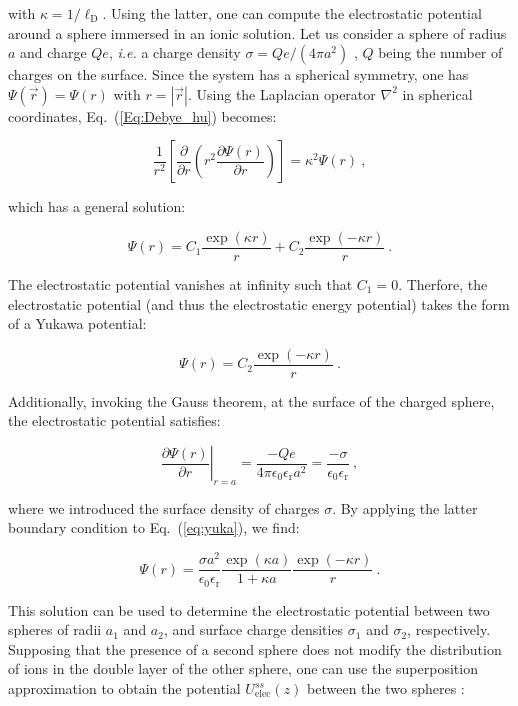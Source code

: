 with $\kappa = 1/\ell _\mathrm{D}$. Using the latter, one can compute the electrostatic potential around a sphere immersed in an ionic solution. Let us consider a sphere of radius $a$ and charge $Qe$, \textit{i.e.} a charge density $\sigma = Qe/(4\pi a^2)$ , $Q$ being the number of charges on the surface. Since the system has a spherical symmetry, one has $\Psi (\vec{r}) = \Psi(r)$ with $r = |\vec{r}|$. Using the Laplacian operator $\nabla ^2$ in spherical coordinates, Eq.~(\ref{Eq:Debye_hu}) becomes:

\begin{equation}
	\frac{1}{r^2}\left[\frac{\partial}{\partial r} \left(r^2 \frac{\partial \Psi(r)}{\partial r}\right)\right] = \kappa^2  \Psi (r) ~,
\end{equation}

which has a general solution:

\begin{equation}
	\Psi(r) = C_1 \frac{\exp(\kappa r)}{r} + C_2 \frac{\exp(-\kappa r)}{r}~.
\end{equation}

The electrostatic potential vanishes at infinity such that $C_1 = 0$. Therfore, the electrostatic potential (and thus the electrostatic energy potential) takes the form of a Yukawa potential:

\begin{equation}
	\Psi (r) = C_2 \frac{\exp(-\kappa r)}{r} ~.
	\label{eq:yuka}
\end{equation}

Additionally, invoking the Gauss theorem, at the surface of the charged sphere, the electrostatic potential satisfies:

\begin{equation}
	\left. \frac{\partial{\Psi (r)}}{\partial r} \right|_{r=a} = \frac{-Qe}{4 \pi \epsilon_0 \epsilon_\mathrm{r} a^2}  = \frac{-\sigma}{\epsilon_0 \epsilon_\mathrm{r}} ~,
\end{equation}

where we introduced the surface density of charges $\sigma$. By applying the latter boundary condition to Eq.~(\ref{eq:yuka}), we find:

\begin{equation}
	\Psi (r) = \frac{\sigma a^2}{\epsilon_0 \epsilon_\mathrm{r}} \frac{\exp (\kappa a)}{1 + \kappa a} \frac{\exp (-\kappa r)}{r} ~.
\end{equation}

This solution can be used to determine the electrostatic potential between two spheres of radii $a_1$ and $a_2$, and surface charge densities $\sigma_1$ and $\sigma_2$, respectively. Supposing that the presence of a second sphere does not modify the distribution of ions in the double layer of the other sphere, one can use the superposition approximation to obtain the potential $U_\textrm{elec} ^{ss} (z)$ between the two spheres \cite{bell_approximate_1970}:

